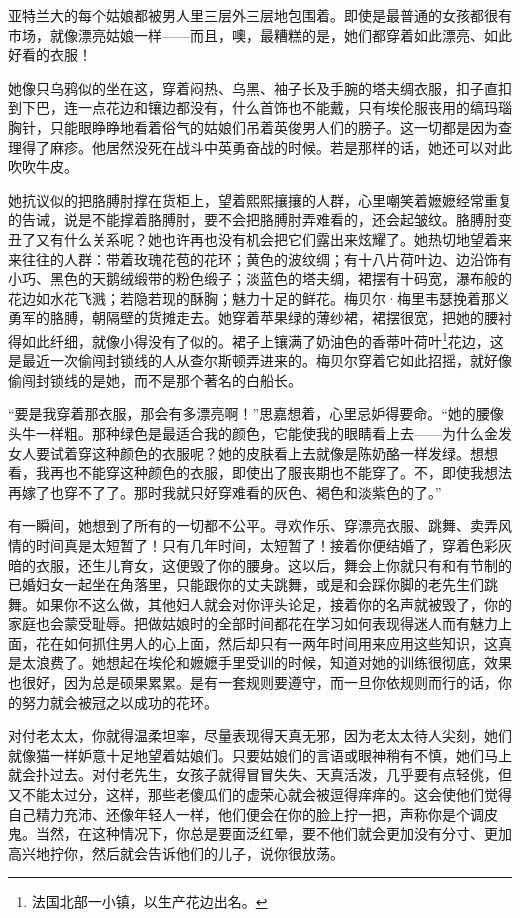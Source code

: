\par 亚特兰大的每个姑娘都被男人里三层外三层地包围着。即使是最普通的女孩都很有市场，就像漂亮姑娘一样——而且，噢，最糟糕的是，她们都穿着如此漂亮、如此好看的衣服！
\par 她像只乌鸦似的坐在这，穿着闷热、乌黑、袖子长及手腕的塔夫绸衣服，扣子直扣到下巴，连一点花边和镶边都没有，什么首饰也不能戴，只有埃伦服丧用的缟玛瑙胸针，只能眼睁睁地看着俗气的姑娘们吊着英俊男人们的膀子。这一切都是因为查理得了麻疹。他居然没死在战斗中英勇奋战的时候。若是那样的话，她还可以对此吹吹牛皮。
\par 她抗议似的把胳膊肘撑在货柜上，望着熙熙攘攘的人群，心里嘲笑着嬷嬷经常重复的告诫，说是不能撑着胳膊肘，要不会把胳膊肘弄难看的，还会起皱纹。胳膊肘变丑了又有什么关系呢？她也许再也没有机会把它们露出来炫耀了。她热切地望着来来往往的人群：带着玫瑰花苞的花环；黄色的波纹绸；有十八片荷叶边、边沿饰有小巧、黑色的天鹅绒缎带的粉色缎子；淡蓝色的塔夫绸，裙摆有十码宽，瀑布般的花边如水花飞溅；若隐若现的酥胸；魅力十足的鲜花。梅贝尔·梅里韦瑟挽着那义勇军的胳膊，朝隔壁的货摊走去。她穿着苹果绿的薄纱裙，裙摆很宽，把她的腰衬得如此纤细，就像小得没有了似的。裙子上镶满了奶油色的香蒂叶荷叶\footnote{法国北部一小镇，以生产花边出名。}花边，这是最近一次偷闯封锁线的人从查尔斯顿弄进来的。梅贝尔穿着它如此招摇，就好像偷闯封锁线的是她，而不是那个著名的白船长。
\par “要是我穿着那衣服，那会有多漂亮啊！”思嘉想着，心里忌妒得要命。“她的腰像头牛一样粗。那种绿色是最适合我的颜色，它能使我的眼睛看上去——为什么金发女人要试着穿这种颜色的衣服呢？她的皮肤看上去就像是陈奶酪一样发绿。想想看，我再也不能穿这种颜色的衣服，即使出了服丧期也不能穿了。不，即使我想法再嫁了也穿不了了。那时我就只好穿难看的灰色、褐色和淡紫色的了。”
\par 有一瞬间，她想到了所有的一切都不公平。寻欢作乐、穿漂亮衣服、跳舞、卖弄风情的时间真是太短暂了！只有几年时间，太短暂了！接着你便结婚了，穿着色彩灰暗的衣服，还生儿育女，这便毁了你的腰身。这以后，舞会上你就只有和有节制的已婚妇女一起坐在角落里，只能跟你的丈夫跳舞，或是和会踩你脚的老先生们跳舞。如果你不这么做，其他妇人就会对你评头论足，接着你的名声就被毁了，你的家庭也会蒙受耻辱。把做姑娘时的全部时间都花在学习如何表现得迷人而有魅力上面，花在如何抓住男人的心上面，然后却只有一两年时间用来应用这些知识，这真是太浪费了。她想起在埃伦和嬷嬷手里受训的时候，知道对她的训练很彻底，效果也很好，因为总是硕果累累。是有一套规则要遵守，而一旦你依规则而行的话，你的努力就会被冠之以成功的花环。
\par 对付老太太，你就得温柔坦率，尽量表现得天真无邪，因为老太太待人尖刻，她们就像猫一样妒意十足地望着姑娘们。只要姑娘们的言语或眼神稍有不慎，她们马上就会扑过去。对付老先生，女孩子就得冒冒失失、天真活泼，几乎要有点轻佻，但又不能太过分，这样，那些老傻瓜们的虚荣心就会被逗得痒痒的。这会使他们觉得自己精力充沛、还像年轻人一样，他们便会在你的脸上拧一把，声称你是个调皮鬼。当然，在这种情况下，你总是要面泛红晕，要不他们就会更加没有分寸、更加高兴地拧你，然后就会告诉他们的儿子，说你很放荡。
